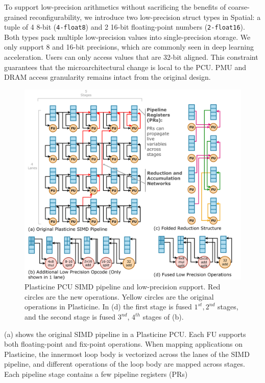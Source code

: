 To support low-precision arithmetics without sacrificing the benefits of coarse-grained reconfigurability,
we introduce two low-precision struct types in Spatial: 
a tuple of 4 8-bit (\texttt{4-float8}) and 2 16-bit floating-point numbers (\texttt{2-float16}).
Both types pack multiple low-precision values into single-precision storage.
We only support 8 and 16-bit precisions, which are commonly seen in deep learning acceleration.
Users can only access values that are 32-bit aligned.
This constraint guarantees that the microarchitectural change is local to the PCU.
PMU and DRAM access granularity remains intact from the original design.

\begin{figure}
  \centering
  \includegraphics[width=1\columnwidth]{figs/lowprec.pdf}
  \caption{Plasticine PCU SIMD pipeline and low-precision support.
  Red circles are the new operations. Yellow circles are the original operations in Plasticine.
  In (d) the first stage is fused $1^{st}, 2^{nd}$ stages, and the second stage is fused
  $3^{nd}$, $4^{th}$ stages of (b).
   }
  \label{fig:lowprec}
\end{figure}
 (a) shows the original SIMD pipeline in a Plasticine PCU.
Each FU supports both floating-point and fix-point operations.
When mapping applications on Plasticine,
  the innermost loop body is vectorized across the lanes of the
SIMD pipeline, and different operations of the loop body are mapped across stages.
Each pipeline stage contains a few pipeline registers (PRs)
